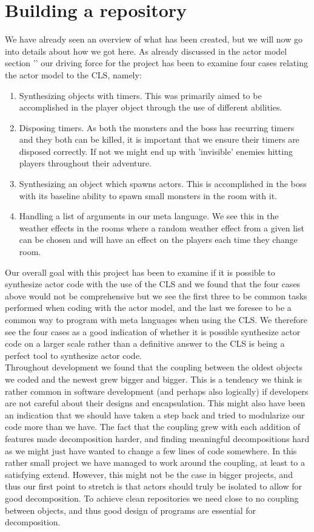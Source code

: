 \section{Building a repository} \label{BuildRep}
We have already seen an overview of what has been created, but we will now go into details about how we got here. As already discussed in the actor model section '' our driving force for the project has been to examine four cases relating the actor model to the CLS, namely:
\begin{enumerate}
	\item Synthesizing objects with timers. This was primarily aimed to be accomplished in the player object through the use of different abilities.
	\item Disposing timers. As both the monsters and the boss has recurring timers and they both can be killed, it is important that we ensure their timers are disposed correctly. If not we might end up with 'invisible' enemies hitting players throughout their adventure.
	\item Synthesizing an object which spawns actors. This is accomplished in the boss with its baseline ability to spawn small monsters in the room with it.
	\item Handling a list of arguments in our meta language. We see this in the weather effects in the rooms where a random weather effect from a given list can be chosen and will have an effect on the players each time they change room.
\end{enumerate}
Our overall goal with this project has been to examine if it is possible to synthesize actor code with the use of the CLS and we found that the four cases above would not be comprehensive but we see the first three to be common tasks performed when coding with the actor model, and the last we foresee to be a common way to program with meta languages when using the CLS. We therefore see the four cases as a good indication of whether it is possible synthesize actor code on a larger scale rather than a definitive answer to the CLS is being a perfect tool to synthesize actor code.\\

Throughout development we found that the coupling between the oldest objects we coded and the newest grew bigger and bigger. This is a tendency we think is rather common in software development (and perhaps also logically) if developers are not careful about their designs and encapsulation. This might also have been an indication that we should have taken a step back and tried to modularize our code more than we have. The fact that the coupling grew with each addition of features made decomposition harder, and finding meaningful decompositions hard as we might just have wanted to change a few lines of code somewhere. In this rather small project we have managed to work around the coupling, at least to a satisfying extend. However, this might not be the case in bigger projects, and thus our first point to stretch is that actors should truly be isolated to allow for good decomposition. To achieve clean repositories we need close to no coupling between objects, and thus good design of programs are essential for decomposition. 

